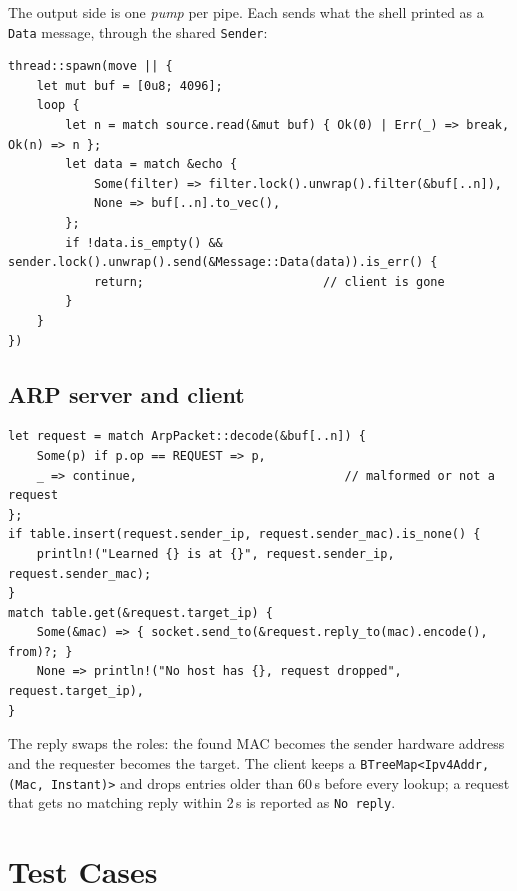 \documentclass[11pt,a4paper]{article}
\begin{document}


The output side is one \emph{pump} per pipe. Each sends what the shell printed
as a \texttt{Data} message, through the shared \texttt{Sender}:

\begin{lstlisting}[caption={An output pump (\texttt{server/shell.rs}).}]
thread::spawn(move || {
    let mut buf = [0u8; 4096];
    loop {
        let n = match source.read(&mut buf) { Ok(0) | Err(_) => break, Ok(n) => n };
        let data = match &echo {
            Some(filter) => filter.lock().unwrap().filter(&buf[..n]),
            None => buf[..n].to_vec(),
        };
        if !data.is_empty() && sender.lock().unwrap().send(&Message::Data(data)).is_err() {
            return;                         // client is gone
        }
    }
})
\end{lstlisting}

\subsection{ARP server and client}

\begin{lstlisting}[caption={Learning and answering in the ARP server loop (\texttt{server.rs}).}]
let request = match ArpPacket::decode(&buf[..n]) {
    Some(p) if p.op == REQUEST => p,
    _ => continue,                             // malformed or not a request
};
if table.insert(request.sender_ip, request.sender_mac).is_none() {
    println!("Learned {} is at {}", request.sender_ip, request.sender_mac);
}
match table.get(&request.target_ip) {
    Some(&mac) => { socket.send_to(&request.reply_to(mac).encode(), from)?; }
    None => println!("No host has {}, request dropped", request.target_ip),
}
\end{lstlisting}

The reply swaps the roles: the found MAC becomes the sender hardware address and
the requester becomes the target. The client keeps a
\texttt{BTreeMap<Ipv4Addr, (Mac, Instant)>} and drops entries older than 60\,s
before every lookup; a request that gets no matching reply within 2\,s is
reported as \texttt{No reply}.

\section{Test Cases}
\label{sec:tests}
\end{document}
